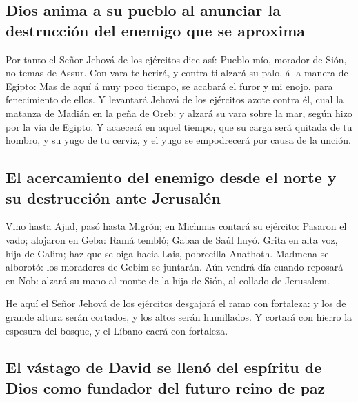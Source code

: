 \hypertarget{dios-anima-a-su-pueblo-al-anunciar-la-destrucciuxf3n-del-enemigo-que-se-aproxima}{%
\subsection{Dios anima a su pueblo al anunciar la destrucción del
enemigo que se
aproxima}\label{dios-anima-a-su-pueblo-al-anunciar-la-destrucciuxf3n-del-enemigo-que-se-aproxima}}

 Por tanto el Señor Jehová de los ejércitos dice así:
Pueblo mío, morador de Sión, no temas de Assur. Con vara te herirá, y
contra ti alzará su palo, á la manera de Egipto:  Mas de
aquí á muy poco tiempo, se acabará el furor y mi enojo, para
fenecimiento de ellos.  Y levantará Jehová de los
ejércitos azote contra él, cual la matanza de Madián en la peña de Oreb:
y alzará su vara sobre la mar, según hizo por la vía de Egipto.
 Y acaecerá en aquel tiempo, que su carga será quitada de
tu hombro, y su yugo de tu cerviz, y el yugo se empodrecerá por causa de
la unción.

\hypertarget{el-acercamiento-del-enemigo-desde-el-norte-y-su-destrucciuxf3n-ante-jerusaluxe9n}{%
\subsection{El acercamiento del enemigo desde el norte y su destrucción
ante
Jerusalén}\label{el-acercamiento-del-enemigo-desde-el-norte-y-su-destrucciuxf3n-ante-jerusaluxe9n}}

 Vino hasta Ajad, pasó hasta Migrón; en Michmas contará
su ejército:  Pasaron el vado; alojaron en Geba: Ramá
tembló; Gabaa de Saúl huyó.  Grita en alta voz, hija de
Galim; haz que se oiga hacia Lais, pobrecilla Anathoth. 
Madmena se alborotó: los moradores de Gebim se juntarán. 
Aún vendrá día cuando reposará en Nob: alzará su mano al monte de la
hija de Sión, al collado de Jerusalem.

 He aquí el Señor Jehová de los ejércitos desgajará el
ramo con fortaleza: y los de grande altura serán cortados, y los altos
serán humillados.  Y cortará con hierro la espesura del
bosque, y el Líbano caerá con fortaleza.

\hypertarget{el-vuxe1stago-de-david-se-llenuxf3-del-espuxedritu-de-dios-como-fundador-del-futuro-reino-de-paz}{%
\subsection{El vástago de David se llenó del espíritu de Dios como
fundador del futuro reino de
paz}\label{el-vuxe1stago-de-david-se-llenuxf3-del-espuxedritu-de-dios-como-fundador-del-futuro-reino-de-paz}}

